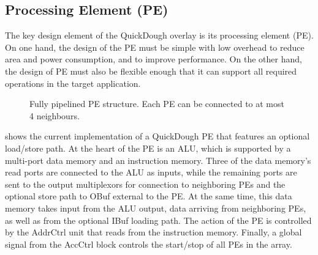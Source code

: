 


\subsection{Processing Element (PE)}
The key design element of the QuickDough overlay is its processing element (PE).
On one hand, the design of the PE must be simple with low overhead to reduce area and power consumption, and to improve performance.
On the other hand, the design of PE must also be flexible enough that it can support all required operations in the target application.

\begin{figure}
\center{\texttt{[image: pe]}}
\caption{Fully pipelined PE structure. Each PE can be connected to at most 4 neighbours.}
\label{fig:pe}
\end{figure}

 shows the current implementation of a QuickDough PE that features an optional load/store path. 
At the heart of the PE is an ALU, which is supported by a multi-port data memory and an instruction memory.
Three of the data memory's read ports are connected to the ALU as inputs, while the remaining ports are sent to the output multiplexors for connection to neighboring PEs and the optional store path to OBuf external to the PE.
At the same time, this data memory takes input from the ALU output, data arriving from neighboring PEs, as well as from the optional IBuf loading path.
The action of the PE is controlled by the AddrCtrl unit that reads from the instruction memory.
Finally, a global signal from the AccCtrl block controls the start/stop of all PEs in the array.


